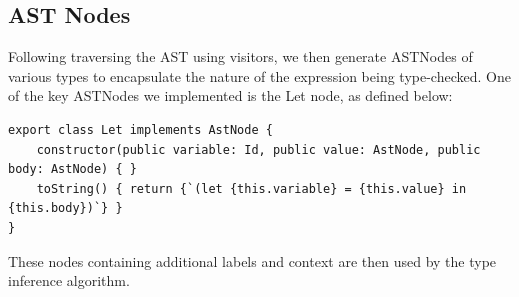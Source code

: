 \subsection{AST Nodes}
Following traversing the AST using visitors, we then generate ASTNodes of various types to encapsulate the nature of the expression being type-checked. One of the key ASTNodes we implemented is the Let node, as defined below:

\scriptsize
\begin{Verbatim}[tabsize=4]
export class Let implements AstNode {
    constructor(public variable: Id, public value: AstNode, public body: AstNode) { }
    toString() { return {`(let {this.variable} = {this.value} in {this.body})`} }
}
\end{Verbatim}

\normalsize

These nodes containing additional labels and context are then used by the type inference algorithm.
